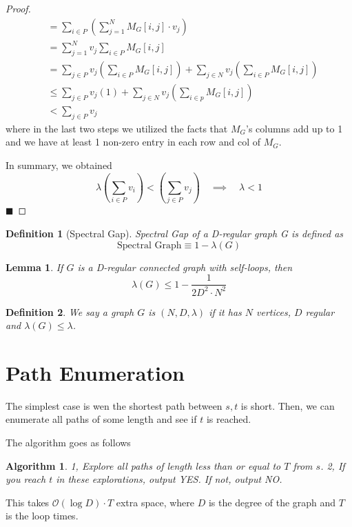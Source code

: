 \documentclass[11pt, letter]{book}
\newcommand{\qed}{\hfill $\blacksquare$}
\newtheorem{algorithm}{Algorithm}[chapter]
\newtheorem{definition}{Definition}[chapter]
\newtheorem{lemma}[theorem]{Lemma}
\begin{document}
\begin{proof}
\begin{align}
	&= \sum_{i \in P} \left( \sum_{j = 1}^N M_G[i, j] \cdot v_j \right) \\
	&= \sum_{j = 1}^N v_j \sum_{i \in P} M_G[i, j] \\
	&= \sum_{j \in P} v_j \left( \sum_{i \in P} M_G[i, j] \right) + \sum_{j \in N} v_j \left( \sum_{i \in P} M_G[i, j] \right) \\
	&\leq \sum_{j \in P} v_j (1) + \sum_{j \in N} v_j \left( \sum_{i \in p} M_G[i, j] \right) \\
	&< \sum_{j \in P} v_j
\end{align}
where in the last two steps we utilized the facts that $M_G$'s columns add up to 1 and we have at least 1 non-zero entry in each row and col of $M_G$. 

In summary, we obtained
\begin{equation}
	\lambda \left( \sum_{i \in P} v_i \right) < \left( \sum_{j \in P} v_j \right) \quad \implies \quad \lambda < 1
\end{equation}
\qed

\end{proof}

\begin{definition}[Spectral Gap]
	Spectral Gap of a D-regular graph G is defined as 
	\begin{equation}
		\text{Spectral Graph} 
		\equiv 1 - \lambda(G)
	\end{equation}
\end{definition}

\begin{lemma}
	If $G$ is a D-regular connected graph with self-loops, then
	\begin{equation}
		\lambda (G) \leq 1 - \frac{1}{2D^2 \cdot N^2}
	\end{equation}
\end{lemma}

\begin{definition}
	We say a graph $G$ is $(N, D, \lambda)$ if it has $N$ vertices, $D$ regular and $\lambda(G) \leq \lambda$. 
\end{definition}


\section{Path Enumeration}
The simplest case is wen the shortest path between $s, t$ is short. Then, we can enumerate all paths of some length and see if $t$ is reached. 

The algorithm goes as follows
\begin{algorithm}
	1, Explore all paths of length less than or equal to $T$ from $s$. 2, If you reach $t$ in these explorations, output YES. If not, output NO. 
\end{algorithm}
This takes $\mathcal O (\log D) \cdot T$ extra space, where $D$ is the degree of the graph and $T$ is the loop times. 
\end{document}
